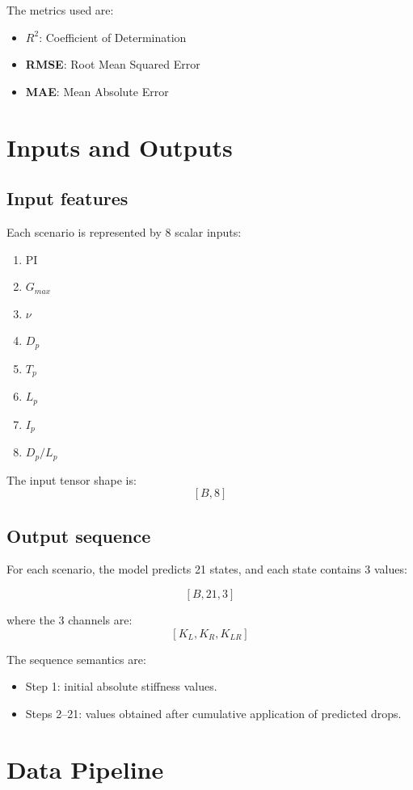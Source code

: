 \documentclass[11pt,a4paper]{article}
\begin{document}
The metrics used are:
\begin{itemize}[nosep]
    \item \textbf{$R^2$}: Coefficient of Determination
    \item \textbf{RMSE}: Root Mean Squared Error
    \item \textbf{MAE}: Mean Absolute Error
\end{itemize}

\section{Inputs and Outputs}

\subsection*{Input features}
Each scenario is represented by 8 scalar inputs:

\begin{enumerate}[nosep]
    \item PI
    \item $G_{max}$
    \item $\nu$
    \item $D_p$
    \item $T_p$
    \item $L_p$
    \item $I_p$
    \item $D_p/L_p$
\end{enumerate}

The input tensor shape is:
$$
[B, 8]
$$

\subsection*{Output sequence}
For each scenario, the model predicts 21 states, and each state contains 3 values:

$$
[B, 21, 3]
$$

where the 3 channels are:
$$
[K_L, K_R, K_{LR}]
$$

The sequence semantics are:
\begin{itemize}[nosep]
    \item Step 1: initial absolute stiffness values.
    \item Steps 2--21: values obtained after cumulative application of predicted drops.
\end{itemize}

\section{Data Pipeline}
\end{document}
